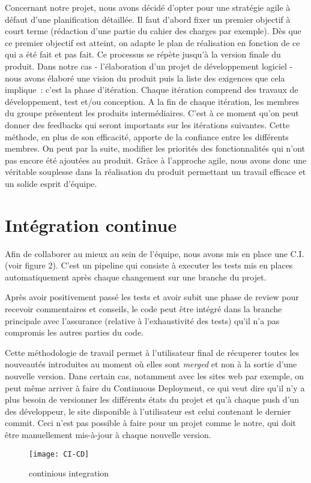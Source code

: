 Concernant notre projet, nous avons décidé d’opter pour une stratégie agile à
défaut d’une planification détaillée. Il faut d’abord fixer un premier objectif
à court terme (rédaction d’une partie du cahier des charges par exemple). Dès
que ce premier objectif est atteint, on adapte le plan de réalisation en
fonction de ce qui a été fait et pas fait. Ce processus se répète jusqu’à la
version finale du produit.
Dans notre cas - l’élaboration d’un projet de développement logiciel - nous
avons élaboré une vision du produit puis la liste des exigences que cela
implique : c’est la phase d’itération. Chaque itération comprend des travaux
de développement, test et/ou conception. A la fin de chaque itération, les membres
du groupe présentent les produits intermédiaires. C’est à ce moment qu’on peut
donner des feedbacks qui seront importants sur les itérations suivantes. Cette
méthode, en plus de son efficacité, apporte de la confiance entre les
différents membres.
On peut par la suite, modifier les priorités des fonctionnalités qui n’ont pas
encore été ajoutées au produit.
Grâce à l’approche agile, nous avons donc une  véritable souplesse dans la
réalisation du produit permettant un travail efficace et un solide esprit
d’équipe.

\section{Intégration continue}
Afin de collaborer au mieux au sein de l'équipe, nous avons mis en place
une C.I. (voir figure 2). C'est un pipeline qui consiste à executer
les tests mis en places automatiquement après chaque changement sur une branche
du projet.
\vspace{0.5cm}

Après avoir positivement passé les tests et avoir subit une phase de review
pour recevoir commentaires et conseils, le code peut être intégré dans la
branche principale avec l'assurance (relative à l’exhaustivité des tests) qu'il
n'a pas compromis les autres parties du code.
\vspace{0.5cm}

Cette méthodologie de travail permet à l’utilisateur final de récuperer toutes
les nouveautés introduites au moment où elles sont \emph{merged} et non à la
sortie d’une nouvelle version. Dans certain cas, notamment avec les sites web
par exemple, on peut même arriver à faire du Continuous Deployment, ce qui veut
dire qu’il n’y a plus besoin de versionner les différents états du projet et
qu’à chaque push d’un des développeur, le site disponible à l’utilisateur est
celui contenant le dernier commit. Ceci n'est pas possible à faire pour un
projet comme le notre, qui doit être manuellement mis-à-jour à chaque nouvelle
version.

\begin{figure}[h]
  \texttt{[image: CI-CD]}
  \caption{continious integration}
\end{figure}
